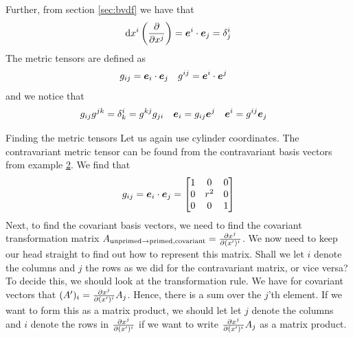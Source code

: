 \documentclass[a4paper, 12pt]{article}
\begin{document}
Further, from section \ref{sec:bvdf} we have that
%
\begin{align*}
 \text{d} x^i \left(\frac{\partial {}}{\partial{x^j}}\right) = \boldsymbol{e}^i\cdot\boldsymbol{e}_j = \delta^i_j
\end{align*}
%
The metric tensors are defined as
%
\begin{align*}
 &g_{ij} = \boldsymbol{e}_i\cdot\boldsymbol{e}_j&
 &g^{ij} = \boldsymbol{e}^i\cdot\boldsymbol{e}^j
\end{align*}
%
and we notice that
%
\begin{align*}
 &g_{ij} g^{jk} = \delta_k^i = g^{kj} g_{ji}&
 &\boldsymbol{e}_i = g_{ij}\boldsymbol{e}^j &
 &\boldsymbol{e}^i = g^{ij}\boldsymbol{e}_j&
\end{align*}
%
\begin{example}{Finding the metric tensors}
 \label{ex:fmt}
 Let us again use cylinder coordinates.
 The contravariant metric tensor can be found from the contravariant
 basis vectors from example \hyperref[ex:vft]{2}. We find that
 \begin{align*}
  g_{ij} = \boldsymbol{e}_i\cdot\boldsymbol{e}_j =
  \begin{bmatrix}
   1 & 0 & 0\\
   0 & r^2 & 0\\
   0 & 0 & 1
  \end{bmatrix}
 \end{align*}
 Next, to find the covariant basis vectors, we need to find the covariant
 transformation matrix $A_{\text{unprimed}\to \text{primed}, \text{covariant}}
 = \frac{\partial {x^j}}{\partial{(x')^i}}$. We now need to keep our head straight to find out how
 to represent this matrix. Shall we let $i$ denote the columns and $j$ the
 rows as we did for the contravariant matrix, or vice versa? To decide this, we
 should look at the transformation rule. We have for covariant vectors that
 $(A')_i = \frac{\partial {x^j}}{\partial{(x')^i}} A_j$. Hence, there is a sum over the $j$'th
 element. If we want to form this as a matrix product, we should let let $j$
 denote the columns and $i$ denote the rows in $\frac{\partial {x^j}}{\partial{(x')^i}}$ if we want
 to write $\frac{\partial {x^j}}{\partial{(x')^i}} A_j$ as a matrix product.


\end{example}
\end{document}
